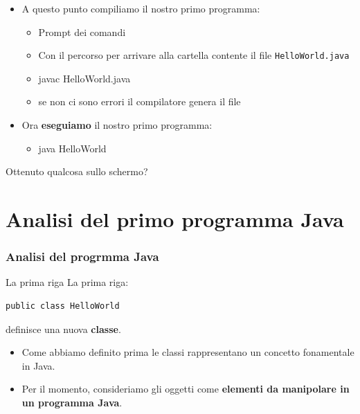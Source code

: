 \begin{frame}
\begin{itemize}
\item A questo punto compiliamo il nostro primo programma: 
\begin{itemize}
\item Prompt dei comandi
\pause
\item {} Con il percorso per arrivare alla cartella contente il file \texttt{HelloWorld.java}
\pause
\item \alert{javac HelloWorld.java}
\pause
\item se non ci sono errori il compilatore genera il file 
\end{itemize}
\pause
\item Ora \textbf{eseguiamo} il nostro primo programma:
\begin{itemize}
\item \alert{java HelloWorld}
\end{itemize}
\end{itemize}
\pause
Ottenuto qualcosa sullo schermo?
\end{frame}

\section*{Analisi del primo programma Java}
\begin{frame}[fragile]
\frametitle{Analisi del progrmma Java}
\begin{block}{La prima riga}
La prima riga:
\begin{lstlisting} 
public class HelloWorld 
\end{lstlisting}
definisce una nuova \textbf{classe}.
\begin{itemize}
\item Come abbiamo definito prima le classi rappresentano un concetto fonamentale in Java.
\item Per il momento, consideriamo gli oggetti come \textbf{elementi da manipolare in un programma Java}.
\end{itemize}
\end{block} 
\end{frame}
